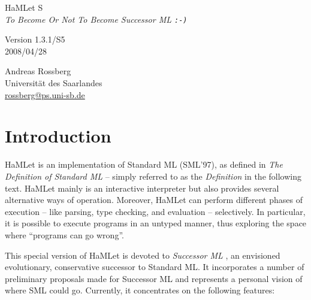 \documentclass[twoside,titlepage]{article}
\begin{document}

\begin{titlepage}
\begin{center}

\vspace*{5cm}
{\Huge HaMLet S} \\
\vspace{5mm}
{\large\it To Become Or Not To Become Successor ML {\tt:-)}} \\
\vspace{1cm}

\vspace{1cm}
Version 1.3.1/S5 \\
2008/04/28

\vspace{3cm}
\large
Andreas Rossberg \\
Universit\"at des Saarlandes \\
\url{rossberg@ps.uni-sb.de}

\end{center}
\end{titlepage}


{
\setlength{\parskip}{0.5ex}
\tableofcontents
}

\vfill
\pagebreak


\section{Introduction}
\label{intro}

HaMLet is an implementation of Standard ML (SML'97), as defined in {\it The Definition of Standard ML} \cite{definition} -- simply referred to as the {\em Definition} in the following text. HaMLet mainly is an interactive interpreter but also provides several alternative ways of operation. Moreover, HaMLet can perform different phases of execution -- like parsing, type checking, and evaluation -- selectively. In particular, it is possible to execute programs in an untyped manner, thus exploring the space where ``programs can go wrong''.

This special version of HaMLet is devoted to {\em Successor ML} \cite{successorml}, an envisioned evolutionary, conservative successor to Standard ML. It incorporates a number of preliminary proposals made for Successor ML and represents a personal vision of where SML could go. Currently, it concentrates on the following features:
\end{document}

